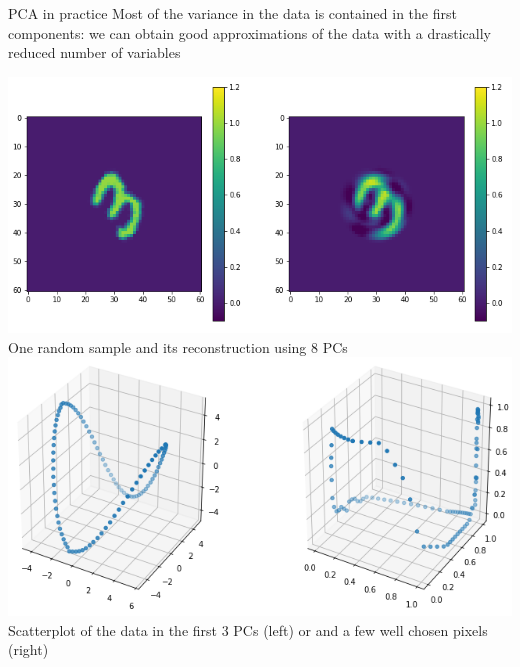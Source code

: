 \documentclass{beamer}
\begin{document}
\begin{frame}{PCA in practice}
Most of the variance in the data is contained in the first components: we can obtain good approximations of the data with a drastically reduced number of variables
\vspace{-0.2cm}
\begin{center}
\includegraphics[scale=0.25]{rec_3_8.png}\\
\tiny{One random sample and its reconstruction using 8 PCs}
\includegraphics[scale=1.2]{scatterplot_pca.png}\\
\tiny{Scatterplot of the data in the first 3 PCs (left) or and a few well chosen pixels (right)}
\end{center}

\end{frame}
\end{document}

